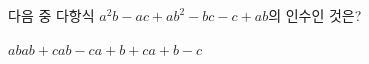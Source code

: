 다음 중 다항식 $a^2b-ac+ab^2-bc-c+ab$의 인수인 것은?
\begin{choices32}{$ab$}{$ab+c$}{$ab-c$}{$a+b+c$}{$a+b-c$}\end{choices32}
